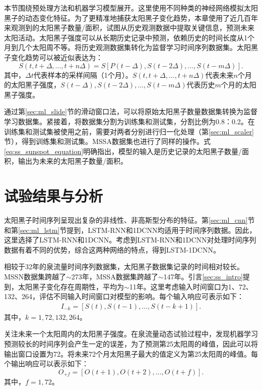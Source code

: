 本节围绕预处理方法和机器学习模型展开。这里使用不同种类的神经网络模拟太阳黑子的动态变化特征。为了更精准地捕获太阳黑子变化趋势，本章使用了近几百年来观测到的太阳黑子数量/面积，试图从历史观测数据中提取关键信息，预测未来太阳活动。太阳黑子强度可以从长期历史记录中预测，依赖历史的时间长度从1个月到几个太阳周不等。将历史观测数据集转化为监督学习时间序列数据集。太阳黑子变化趋势可以被近似表达为：
\begin{equation}
  \label{eq:ss_sunspot_equation}
  S(t,t+\Delta,\ldots,t+n\Delta)=S[P(t-\Delta),S(t-2\Delta),\ldots,S(t-m\Delta)].
\end{equation}
其中，$\Delta t$代表样本的采样间隔（1个月）。$S(t,t+\Delta,\ldots,t+n\Delta)$代表未来$n$个月的太阳黑子强度，$S(t-\Delta),S(t-2\Delta),\ldots,S(t-m\Delta)$代表历史$m$个月的太阳黑子强度。

通过第\ref{sec:ml_slide}节的滑动窗口法，可以将原始太阳黑子数量数据集转换为监督学习数据集。紧接着，将数据集分割为训练集和测试集，分割比例为0.8：0.2。在训练集和测试集被使用之前，需要对两者分别进行归一化处理（第\ref{sec:ml_scaler}节），得到训练集和测试集。MSSA数据集也进行了同样的操作。式\ref{eq:ss_sunspot_equation}明确指出，模型的输入是历史记录的太阳黑子数量/面积，输出为未来的太阳黑子数量/面积。

\section{试验结果与分析}\label{sec:ss_result}

太阳黑子时间序列呈现出复杂的非线性、非高斯型分布的特征。第\ref{sec:ml_cnn}节和第\ref{sec:ml_lstm}节提到，LSTM-RNN和1DCNN均适用于时间序列数据。因此，这里选择了LSTM-RNN和1DCNN。考虑到LSTM-RNN和1DCNN对处理时间序列数据有着不同的优势，综合这两种网络的特点，得到LSTM-1DCNN。

相较于32年的泉流量时间序列数据集，太阳黑子数据集记录的时间相对较长。MSSN数据集跨越了$\sim$273年，MSSA数据集跨越了$\sim$147年。引言\ref{sec:ss_intro}提到，太阳黑子变化存在周期性，平均为$\sim$11年。这里考虑输入时间窗口为1、72、132、264，评估不同输入时间窗口对模型的影响。每个输入响应可表示如下：
\begin{equation}
  \label{eq:ss_input}
  \begin{split}
    I_{-k}=[S(t),S(t-1),\ldots,S(t-k+1)].
  \end{split}
\end{equation}
其中，$k=1,72,132,264$。

关注未来一个太阳周内的太阳黑子强度。在泉流量动态试验过程中，发现机器学习预测较长的时间序列会产生一定的误差，为了预测第25太阳周的峰值，因此可以将输出窗口设置为72。将未来72个月太阳黑子最大的值定义为第25太阳周的峰值。每个输出响应可以表示如下：
\begin{equation}
  \label{eq:ss_output}
  O_{+f}=[O(t+1),O(t+2),\ldots,O(t+f)].
\end{equation}
其中，$f=1,72$。

